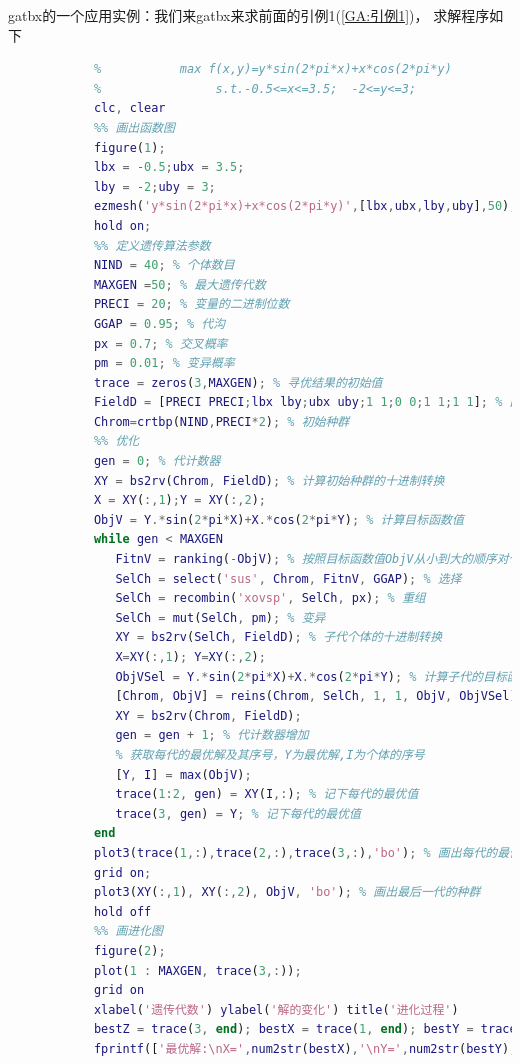             \par
            gatbx的一个应用实例：我们来gatbx来求前面的引例1(\ref{GA:引例1})，
            求解程序如下
            \begin{lstlisting}[language=Matlab]
            %% 用gatbx工具箱求解“智能优化”章节的引例
            %           max f(x,y)=y*sin(2*pi*x)+x*cos(2*pi*y)
            %                s.t.-0.5<=x<=3.5;  -2<=y<=3;
            clc, clear
            %% 画出函数图
            figure(1);
            lbx = -0.5;ubx = 3.5;
            lby = -2;uby = 3;
            ezmesh('y*sin(2*pi*x)+x*cos(2*pi*y)',[lbx,ubx,lby,uby],50); % 画出函数曲线
            hold on;
            %% 定义遗传算法参数
            NIND = 40; % 个体数目
            MAXGEN =50; % 最大遗传代数
            PRECI = 20; % 变量的二进制位数
            GGAP = 0.95; % 代沟
            px = 0.7; % 交叉概率
            pm = 0.01; % 变异概率
            trace = zeros(3,MAXGEN); % 寻优结果的初始值
            FieldD = [PRECI PRECI;lbx lby;ubx uby;1 1;0 0;1 1;1 1]; % 区域描述器
            Chrom=crtbp(NIND,PRECI*2); % 初始种群
            %% 优化
            gen = 0; % 代计数器
            XY = bs2rv(Chrom, FieldD); % 计算初始种群的十进制转换
            X = XY(:,1);Y = XY(:,2);
            ObjV = Y.*sin(2*pi*X)+X.*cos(2*pi*Y); % 计算目标函数值
            while gen < MAXGEN
               FitnV = ranking(-ObjV); % 按照目标函数值ObjV从小到大的顺序对个体进行排序，并返回个体的适应度列向量
               SelCh = select('sus', Chrom, FitnV, GGAP); % 选择
               SelCh = recombin('xovsp', SelCh, px); % 重组
               SelCh = mut(SelCh, pm); % 变异
               XY = bs2rv(SelCh, FieldD); % 子代个体的十进制转换
               X=XY(:,1); Y=XY(:,2);
               ObjVSel = Y.*sin(2*pi*X)+X.*cos(2*pi*Y); % 计算子代的目标函数值
               [Chrom, ObjV] = reins(Chrom, SelCh, 1, 1, ObjV, ObjVSel); % 重插入子代到父代，得到新种群
               XY = bs2rv(Chrom, FieldD);
               gen = gen + 1; % 代计数器增加
               % 获取每代的最优解及其序号，Y为最优解,I为个体的序号
               [Y, I] = max(ObjV);
               trace(1:2, gen) = XY(I,:); % 记下每代的最优值
               trace(3, gen) = Y; % 记下每代的最优值
            end
            plot3(trace(1,:),trace(2,:),trace(3,:),'bo'); % 画出每代的最优点
            grid on;
            plot3(XY(:,1), XY(:,2), ObjV, 'bo'); % 画出最后一代的种群
            hold off
            %% 画进化图
            figure(2);
            plot(1 : MAXGEN, trace(3,:));
            grid on
            xlabel('遗传代数') ylabel('解的变化') title('进化过程')
            bestZ = trace(3, end); bestX = trace(1, end); bestY = trace(2, end);
            fprintf(['最优解:\nX=',num2str(bestX),'\nY=',num2str(bestY),'\nZ=',num2str(bestZ),'\n'])
            \end{lstlisting}
